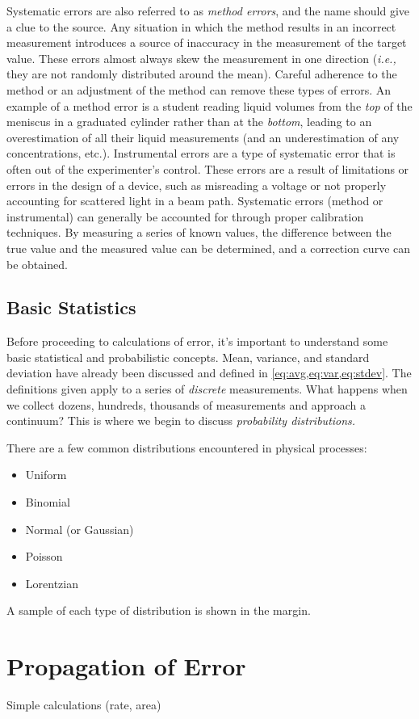 Systematic errors are also referred to as \emph{method errors}, and the name should give a clue to the source. 
Any situation in which the method results in an incorrect measurement introduces a source of inaccuracy in the measurement of the target value. 
These errors almost always skew the measurement in one direction (\emph{i.e.,} they are not randomly distributed around the mean). 
Careful adherence to the method or an adjustment of the method can remove these types of errors. 
An example of a method error is a student reading liquid volumes from the \emph{top} of the meniscus in a graduated cylinder rather than at the \emph{bottom}, leading to an overestimation of all their liquid measurements (and an underestimation of any concentrations, etc.). 
Instrumental errors are a type of systematic error that is often out of the experimenter's control. 
These errors are a result of limitations or errors in the design of a device, such as misreading a voltage or not properly accounting for scattered light in a beam path. 
Systematic errors (method or instrumental) can generally be accounted for through proper calibration techniques. 
By measuring a series of known values, the difference between the true value and the measured value can be determined, and a correction curve can be obtained. 

\subsection{Basic Statistics} %
\label{sub:basic_statistics}

Before proceeding to calculations of error, it's important to understand some basic statistical and probabilistic concepts. 
Mean, variance, and standard deviation have already been discussed and defined in \cref{eq:avg,eq:var,eq:stdev}. 
The definitions given apply to a series of \emph{discrete} measurements. 
What happens when we collect dozens, hundreds, thousands of measurements and approach a continuum?
This is where we begin to discuss \emph{probability distributions.}

There are a few common distributions encountered in physical processes:

\begin{itemize}
	\item Uniform
	\item Binomial
	\item Normal (or Gaussian)
	\item Poisson
	\item Lorentzian
\end{itemize}

A sample of each type of distribution is shown in the margin. 


\section{Propagation of Error} %
\label{sec:propagation_of_error}

Simple calculations (rate, area)
